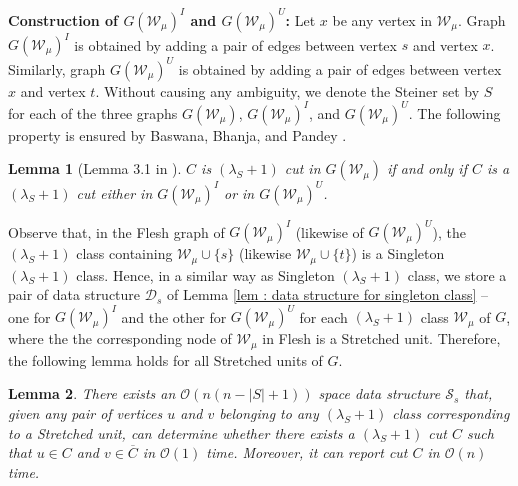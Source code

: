 \documentclass[letterpaper,11pt]{article}
\newtheorem{lemma}{Lemma}[]
\begin{document}
\noindent
\textbf{Construction of $G({\mathcal W}_{\mu})^I$ and $G({\mathcal W}_{\mu})^U$:} Let $x$ be any vertex in ${\mathcal W}_{\mu}$. Graph $G({\mathcal W}_{\mu})^I$ is obtained by adding a pair of edges between vertex $s$ and vertex $x$. Similarly, graph $G({\mathcal W}_{\mu})^U$ is obtained by adding a pair of edges between vertex $x$ and vertex $t$. Without causing any ambiguity, we denote the Steiner set by $S$ for each of the three graphs $G({\mathcal W}_{\mu})$, $G({\mathcal W}_{\mu})^I$, and $G({\mathcal W}_{\mu})^U$. The following property is ensured by Baswana, Bhanja, and Pandey \cite{DBLP:journals/talg/BaswanaBP23}.
\begin{lemma} [Lemma 3.1 in \cite{DBLP:journals/talg/BaswanaBP23}]
    $C$ is $(\lambda_S+1)$ cut in $G({\mathcal W}_{\mu})$ if and only if $C$ is a $(\lambda_S+1)$ cut either in $G({\mathcal W}_{\mu})^I$ or in $G({\mathcal W}_{\mu})^U$.
\end{lemma}
Observe that, in the Flesh graph of  $G({\mathcal W}_{\mu})^I$ (likewise of $G({\mathcal W}_{\mu})^U$), the $(\lambda_S+1)$ class containing ${\mathcal W}_{\mu}\cup \{s\}$ (likewise ${\mathcal W}_{\mu}\cup \{t\}$) is a Singleton $(\lambda_S+1)$ class. Hence, in a similar way as Singleton $(\lambda_S+1)$ class, we store a pair of data structure ${\mathcal D}_s$ of Lemma \ref{lem : data structure for singleton class} -- one for $G({\mathcal W}_{\mu})^I$ and the other for $G({\mathcal W}_{\mu})^U$ for each $(\lambda_S+1)$ class ${\mathcal W}_{\mu}$ of $G$, where the the corresponding node of ${\mathcal W}_{\mu}$ in Flesh is a Stretched unit. Therefore, the following lemma holds for all Stretched units of $G$.
\begin{lemma} \label{lem : data structure for stretched units}
    There exists an ${\mathcal O}(n(n-|S|+1))$ space data structure ${\mathcal S}_s$ that, given any pair of vertices $u$ and $v$ belonging to any $(\lambda_S+1)$ class corresponding to a Stretched unit, can determine whether there exists a $(\lambda_S+1)$ cut $C$ such that $u\in C$ and $v\in \overline{C}$ in ${\mathcal O}(1)$ time. Moreover, it can report cut $C$ in ${\mathcal O}(n)$ time.
\end{lemma}
\end{document}
